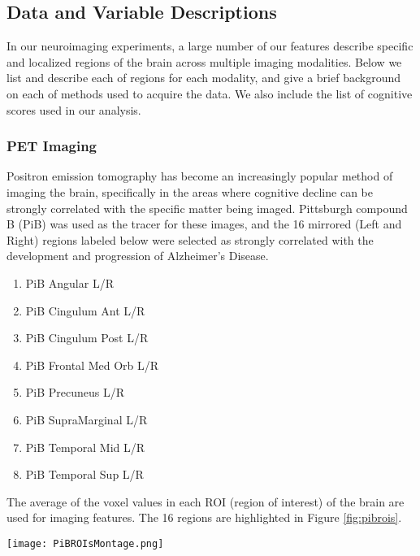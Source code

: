 \subsection*{Data and Variable Descriptions}
In our neuroimaging experiments, a large number of our features describe specific and localized regions of the brain across multiple imaging modalities. Below we list and describe each of regions for each modality, and give a brief background on each of methods used to acquire the data. We also include the list of cognitive scores used in our analysis.

\subsubsection*{PET Imaging}
Positron emission tomography has become an increasingly popular method of imaging the brain, specifically in the areas where cognitive decline can be strongly correlated with the specific matter being imaged. Pittsburgh compound B (PiB) was used as the tracer for these images, and the 16 mirrored (Left and Right) regions labeled below were selected as strongly correlated with the development and progression of Alzheimer's Disease.
{\small
\begin{enumerate}
\item PiB Angular L/R
\item PiB Cingulum Ant L/R
\item PiB Cingulum Post L/R
\item PiB Frontal Med Orb L/R
\item PiB Precuneus L/R
\item PiB SupraMarginal L/R
\item PiB Temporal Mid L/R
\item PiB Temporal Sup L/R
\end{enumerate}
}

The average of the voxel values in each ROI (region of interest) of the brain are used for imaging features.
The 16 regions are highlighted in Figure \ref{fig:pibrois}.

\begin{figure*}[h]
\centering
  \texttt{[image: PiBROIsMontage.png]}
  \caption{\label{fig:pibrois}16 Positron Emission Tomography (PET) regions.}
\end{figure*}

\newpage

